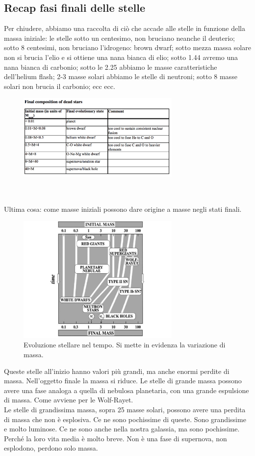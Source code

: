 \documentclass[a4paper,11pt]{article}
\begin{document}
\subsection{Recap fasi finali delle stelle}
Per chiudere, abbiamo una raccolta di ciò che accade alle stelle in funzione della massa iniziale: le stelle sotto un centesimo, non bruciano neanche il deuterio; sotto 8 centesimi, non bruciano l'idrogeno: brown dwarf; sotto mezza massa solare non si brucia l'elio e si ottiene una nana bianca di elio; sotto 1.44 avremo una nana bianca di carbonio; sotto le 2.25 abbiamo le masse caratteristiche dell'helium flash; 2-3 masse solari abbiamo le stelle di neutroni; sotto 8 masse solari non brucia il carbonio; ecc ecc.\\
\begin{figure}[h!!]
        \centering
        \includegraphics[width=8cm]{lezione 28 novembre/tabellamassefinali.png}
        \label{lezione 28 novembre/tabellamassefinali.png}
    \end{figure}
    \\
    \\
Ultima cosa: come masse iniziali possono dare origine a masse negli stati finali. \\
\begin{figure}[h!!]
        \centering
        \includegraphics[width=8cm]{lezione 28 novembre/evoluzionemasse.jpg}
        \caption{Evoluzione stellare nel tempo. Si mette in evidenza la variazione di massa.}
        \label{lezione 28 novembre/evoluzionemasse.jpg}
    \end{figure}
Queste stelle all'inizio hanno valori più grandi, ma anche enormi perdite di massa. Nell'oggetto finale la massa si riduce. Le stelle di grande massa possono avere una fase analoga a quella di nebulosa planetaria, con una grande espulsione di massa. Come avviene per le Wolf-Rayet. \\ Le stelle di grandissima massa, sopra 25 masse solari, possono avere una perdita di massa che non è esplosiva. Ce ne sono pochissime di queste. Sono grandissime e molto luminose. Ce ne sono anche nella nostra galassia, ma sono pochissime. Perché la loro vita media è molto breve. Non è una fase di supernova, non esplodono, perdono solo massa.
\end{document}

